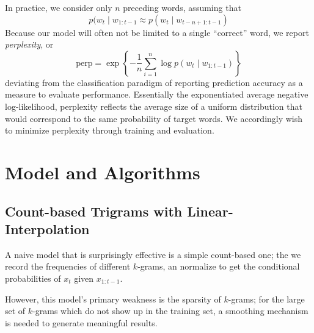 \documentclass[11pt]{article}
\begin{document}
In practice, we consider only $n$ preceding words, assuming that
\[
p(w_t \mid w_{1:t-1} \approx p(w_t \mid w_{t - n + 1: t-1})
\]
Because our model will often not be limited to a single ``correct'' word, we report \textit{perplexity}, or
\[
\text{perp} = \exp\left\{-\frac{1}{n}\sum_{i=1}^n \log p(w_t \mid w_{1: t-1})\right\}
\]
deviating from the classification paradigm of reporting prediction accuracy as a measure to evaluate performance. Essentially the exponentiated average negative log-likelihood, perplexity reflects the average size of a uniform distribution that would correspond to the same probability of target words. We accordingly wish to minimize perplexity through training and evaluation.




\section{Model and Algorithms}

\subsection{Count-based Trigrams with Linear-Interpolation}
A naive model that is surprisingly effective is a simple count-based one; the we record the frequencies of different $k$-grams, an normalize to get the conditional probabilities of $x_t$ given $x_{1:t-1}$.

However, this model's primary weakness is the sparsity of $k$-grams; for the large set of $k$-grams which do not show up in the training set, a smoothing mechanism is needed to generate meaningful results.
\end{document}
